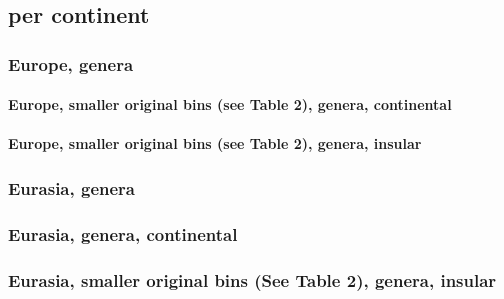 \documentclass[]{article}
\let\oldparagraph\paragraph
\renewcommand{\paragraph}[1]{\oldparagraph{#1}\mbox{}}
\begin{document}
\newpage

\subsection{per continent}\label{per-continent}

\subsubsection{Europe, genera}\label{europe-genera}

\newpage

\paragraph{Europe, smaller original bins (see Table 2), genera,
continental}\label{europe-smaller-original-bins-see-table-2-genera-continental}

\newpage

\paragraph{Europe, smaller original bins (see Table 2), genera,
insular}\label{europe-smaller-original-bins-see-table-2-genera-insular}

\newpage 

\subsubsection{Eurasia, genera}\label{eurasia-genera}

\newpage 

\subsubsection{Eurasia, genera,
continental}\label{eurasia-genera-continental}

\newpage 

\subsubsection{Eurasia, smaller original bins (See Table 2), genera,
insular}\label{eurasia-smaller-original-bins-see-table-2-genera-insular}
\end{document}
